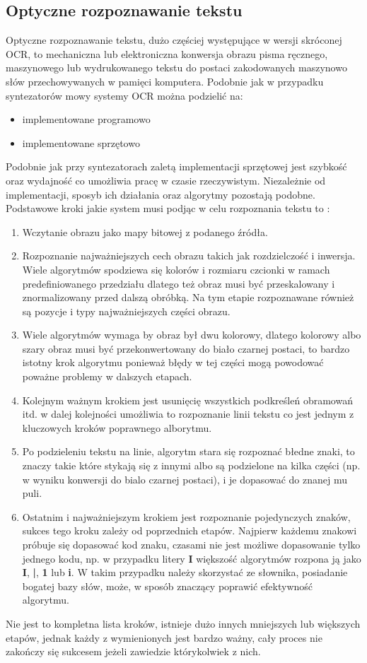 \subsection{Optyczne rozpoznawanie tekstu}
Optyczne rozpoznawanie tekstu, dużo częściej występujące w wersji skróconej OCR, to mechaniczna lub elektroniczna konwersja obrazu pisma ręcznego, maszynowego lub wydrukowanego tekstu do postaci zakodowanych maszynowo słów przechowywanych w pamięci komputera. Podobnie jak w przypadku syntezatorów mowy systemy OCR można podzielić na:
\begin{itemize}
	\item implementowane programowo
	\item implementowane sprzętowo
\end{itemize}
Podobnie jak przy syntezatorach zaletą implementacji sprzętowej jest szybkość oraz wydajność co umożliwia pracę w czasie rzeczywistym. Niezależnie od implementacji, sposyb ich działania oraz algorytmy pozostają podobne. Podstawowe kroki jakie system musi podjąc w celu rozpoznania tekstu to \cite{noor2005} :
\begin{enumerate}
	\item Wczytanie obrazu jako mapy bitowej z podanego źródła.
	\item Rozpoznanie najważniejszych cech obrazu takich jak rozdzielczość i inwersja. Wiele algorytmów spodziewa się kolorów i rozmiaru czcionki w ramach predefiniowanego przedziału dlatego też obraz musi być przeskalowany i znormalizowany przed dalszą obróbką. Na tym etapie rozpoznawane również są pozycje i typy najważniejszych części obrazu.
	\item Wiele algorytmów wymaga by obraz był dwu kolorowy, dlatego kolorowy albo szary obraz musi być przekonwertowany do biało czarnej postaci, to bardzo istotny krok algorytmu ponieważ błędy w tej części mogą powodować poważne problemy w dalszych etapach.
	\item Kolejnym ważnym krokiem jest usunięcię wszystkich podkreśleń obramowań itd. w dalej kolejności umożliwia to rozpoznanie linii tekstu co jest jednym z kluczowych kroków poprawnego alborytmu.
	\item Po podzieleniu tekstu na linie, algorytm stara się rozpoznać błedne znaki, to znaczy takie które stykają się z innymi albo są podzielone na kilka części (np. w wyniku konwersji do bialo czarnej postaci), i je dopasować do znanej mu puli.
	\item Ostatnim i najważniejszym krokiem jest rozpoznanie pojedynczych znaków, sukces tego kroku zależy od poprzednich etapów. Najpierw każdemu znakowi próbuje się dopasować kod znaku, czasami nie jest możliwe dopasowanie tylko jednego kodu, np. w przypadku litery \textbf{I} większość algorytmów rozpona ją jako \textbf{I}, \textbf{|}, \textbf{1} lub \textbf{i}. W takim przypadku należy skorzystać ze słownika, posiadanie bogatej bazy słów, może, w sposób znaczący poprawić efektywność algorytmu.
\end{enumerate}
Nie jest to kompletna lista kroków, istnieje dużo innych mniejszych lub większych etapów, jednak każdy z wymienionych jest bardzo ważny, cały proces nie zakończy się sukcesem jeżeli zawiedzie którykolwiek z nich. 
